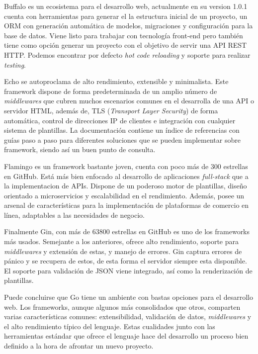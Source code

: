 Buffalo es un ecosistema para el desarrollo web, actualmente en su version 1.0.1 cuenta con herramientas para generar el la estructura inicial de un proyecto, un ORM con generación automática de modelos, migraciones y configuración para la base de datos. Viene listo para trabajar con tecnología front-end pero también tiene como opción generar un proyecto con el objetivo de servir una API REST HTTP. Podemos encontrar por defecto \textit{hot code reloading} y soporte para realizar \textit{testing}.
              
Echo se autoproclama de alto rendimiento, extensible y minimalista. Este framework dispone de forma predeterminada de un amplio número de \textit{middlewares} que cubren muchos escenarios comunes en el desarrolla de una API o servidor HTML, además de, TLS (\textit{Transport Layer Security}) de forma automática, control de direcciones IP de clientes e integración con cualquier sistema de plantillas. La documentación contiene un índice de referencias con guías paso a paso para diferentes soluciones que se pueden implementar sobre framework, siendo así un buen punto de consulta.

Flamingo es un framework bastante joven, cuenta con poco más de 300 estrellas en GitHub. Está más bien enfocado al desarrollo de aplicaciones \textit{full-stack} que a la implementacion de APIs. Dispone de un poderoso motor de plantillas, diseño orientado a microservicios y escalabilidad en el rendimiento. Además, posee un arsenal de características para la implementación de plataformas de comercio en línea, adaptables a las necesidades de negocio.

Finalmente Gin, con más de 63800 estrellas en GitHub es uno de los frameworks más usados. Semejante a los anteriores, ofrece alto rendimiento, soporte para \textit{middlewares} y extensión de estas, y manejo de errores. Gin captura errores  de pánico y se recupera de estos, de esta forma el servidor siempre esta disponible. El soporte para validación de JSON viene integrado, así como la renderización de plantillas.

Puede concluirse que Go tiene un ambiente con bastas opciones para el desarrollo web. Los frameworks, aunque algunos más consolidados que otros, comparten varias características comunes: extensibilidad, validación de datos, \textit{middlewares} y el alto rendimiento típico del lenguaje. Estas cualidades junto con las herramientas estándar que ofrece el lenguaje hace del desarrollo un proceso bien definido a la hora de afrontar un nuevo proyecto.

